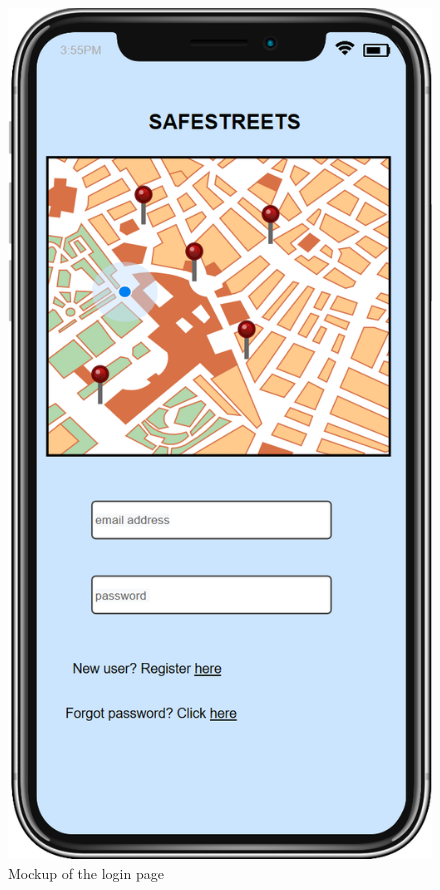 	\begin{figure}[h!]
	
	\medskip
	
		\centering
		\includegraphics[scale=0.50]{Images/login_mockup}
		\caption{Mockup of the login page}
	\end{figure}
